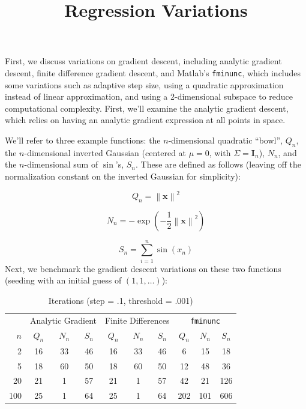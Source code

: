 \documentclass[11pt,letterpaper]{article}
\title{Regression Variations\vspace{-3.5ex}}
\begin{document}
\maketitle
\vspace{-2em}
First, we discuss variations on gradient descent, including analytic gradient descent, finite difference gradient descent, and Matlab's \texttt{fminunc}, which includes some variations such as adaptive step size, using a quadratic approximation instead of linear approximation, and using a 2-dimensional subspace to reduce computational complexity. First, we'll examine the analytic gradient descent, which relies on having an analytic gradient expression at all points in space.

We'll refer to three example functions: the $n$-dimensional quadratic ``bowl'', $Q_n$, the $n$-dimensional inverted Gaussian (centered at $\mu = 0$, with $\Sigma = \mathbf I_n$), $N_n$, and the $n$-dimensional sum of $\sin$'s, $S_n$. These are defined as follows (leaving off the normalization constant on the inverted Gaussian for simplicity):

\[ Q_n = \left\| \mathbf x \right\| ^2 \]

\[ N_n = -\exp{\left(-\dfrac{1}{2} \left\| \mathbf x \right\| ^2 \right)} \]

\[ S_n = \sum_{i=1}^n \sin(x_n) \]
Next, we benchmark the gradient descent variations on these two functions (seeding with an initial guess of $(1,1,\ldots)$):

\begin{table}[h]
\centering
\caption{Iterations (step = .1, threshold = .001)}
\begin{tabular}{r|ccc|ccc|ccc}
   & \multicolumn{3}{|c}{Analytic Gradient} & \multicolumn{3}{|c}{Finite Differences} & \multicolumn{3}{|c}{\texttt{fminunc}} \\
$n$& $Q_n$         & $N_n$        & $S_n$   & $Q_n$              & $N_n$   & $S_n$           & $Q_n$         & $N_n$        & $S_n$ \\\hline
2  & 16            & 33           & 46      & 16                 & 33      & 46              & 6             & 15           & 18    \\
5  & 18            & 60           & 50      & 18                 & 60      & 50              & 12            & 48           & 36    \\
20 & 21            &  1           & 57      & 21                 &  1      & 57              & 42            & 21           & 126   \\
100& 25            &  1           & 64      & 25                 &  1      & 64              & 202           & 101          & 606   
\end{tabular}
\end{table}
\end{document}
